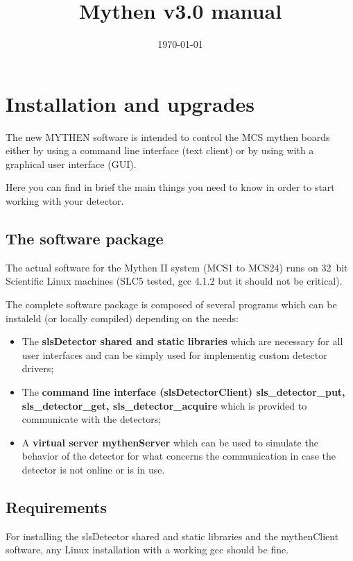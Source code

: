 \documentclass{report}
\begin{document}
\title{Mythen v3.0 manual}
\date{\today}
\maketitle


\chapter{Installation and upgrades}

The new MYTHEN software is intended to control the MCS mythen boards either by using a command line interface (text client) or by using with a graphical user interface (GUI).

Here you can find in brief the main things you need to know in order to start working with your detector. 

\section{The software package}

The actual software for the Mythen II system (MCS1 to MCS24) runs on 32~bit Scientific Linux machines (SLC5 tested, gcc 4.1.2 but it should not be critical). 

The complete software package is composed of several programs which can be instaleld (or locally compiled) depending on the needs:
\begin{itemize}
\item The \textbf{slsDetector shared and static libraries} which are necessary for all user interfaces and can be simply used for implementig custom detector drivers;
\item The \textbf{command line interface (slsDetectorClient) sls\_detector\_put, sls\_detector\_get, sls\_detector\_acquire} which is provided to communicate with the detectors;
\item A \textbf{virtual server mythenServer} which can be used to simulate the behavior of the detector for what concerns the communication in case the detector is not online or is in use.
\end{itemize}



\section{Requirements}

For installing the slsDetector shared and static libraries and the mythenClient software, any Linux installation with a working gcc should be fine.\\
\end{document}

